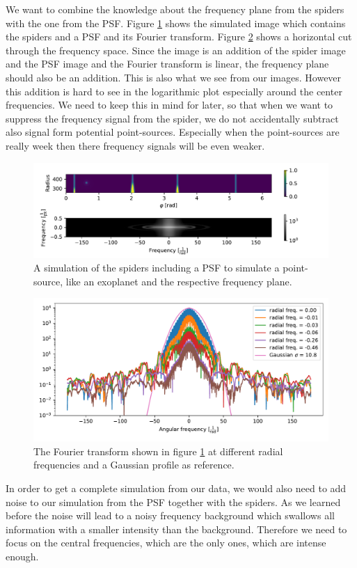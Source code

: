 We want to combine the knowledge about the frequency plane from the spiders with the one from the PSF. Figure \ref{fig:simulated_spyder_PSF} shows the simulated image which contains the spiders and a PSF and its Fourier transform. Figure \ref{fig:simspi_PSF_angularfreq} shows a horizontal cut through the frequency space. Since the image is an addition of the spider image and the PSF image and the Fourier transform is linear, the frequency plane should also be an addition. This is also what we see from our images. However this addition is hard to see in the logarithmic plot especially around the center frequencies. We need to keep this in mind for later, so that when we want to suppress the frequency signal from the spider, we do not accidentally subtract also signal form potential point-sources. Especially when the point-sources are really week then there frequency signals will be even weaker. 
\begin{figure}[H]
	\centering
		\includegraphics[width=1.1\textwidth]{pics/simulated_spyder_PSF.pdf}
		\caption{A simulation of the spiders including a PSF to simulate a point-source, like an exoplanet and the respective frequency plane.}
		\label{fig:simulated_spyder_PSF}
\end{figure}
\begin{figure}[H]
	\centering
		\includegraphics[width=1.0\textwidth]{pics/simspi_PSF_angularfreq.pdf}
		\caption{The Fourier transform shown in figure \ref{fig:simulated_spyder_PSF} at different radial frequencies and a Gaussian profile as reference.}
		\label{fig:simspi_PSF_angularfreq}
\end{figure}
In order to get a complete simulation from our data, we would also need to add noise to our simulation from the PSF together with the spiders. As we learned before the noise will lead to a noisy frequency background which swallows all information with a smaller intensity than the background. Therefore we need to focus on the central frequencies, which are the only ones, which are intense enough. 